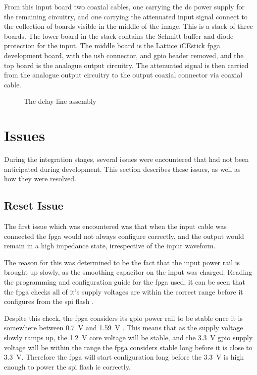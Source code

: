 From this input board two coaxial cables, one carrying the \gls{dc} power supply for the remaining circuitry, and one carrying the attenuated input signal connect to the collection of boards visible in the middle of the image. This is a stack of three boards. The lower board in the stack contains the Schmitt buffer and diode protection for the input. The middle board is the Lattice iCEstick \gls{fpga} development board, with the \gls{usb} connector, and \gls{gpio} header removed, and the top board is the analogue output circuitry. The attenuated signal is then carried from the analogue output circuitry to the output coaxial connector via coaxial cable.

\begin{figure}[ht]
	\centering
	\caption{The delay line assembly}
	\label{fig:delay-line-assy}
\end{figure}



\section{Issues}

During the integration stages, several issues were encountered that had not been anticipated during development. This section describes these issues, as well as how they were resolved.

\subsection{ Reset Issue}
The first issue which was encountered was that when the input cable was connected the \gls{fpga} would not always configure correctly, and the output would remain in a high impedance state, irrespective of the input waveform.

The reason for this was determined to be the fact that the input power rail is brought up slowly, as the smoothing capacitor on the input was charged. Reading the programming and configuration guide for the \gls{fpga} used, it can be seen that the \gls{fpga} checks all of it's supply voltages are within the correct range before it configures from the \gls{spi} flash \cite[p.4]{lattice2016}.

Despite this check, the \gls{fpga} considers its \gls{gpio} power rail to be stable once it is somewhere between \SI{0.7}{\volt} and \SI{1.59}{\volt} \cite[p.3-2]{lattice2017a}. This means that as the supply voltage slowly ramps up, the \SI{1.2}{\volt} core voltage will be stable, and the \SI{3.3}{\volt} \gls{gpio} supply voltage will be within the range the \gls{fpga} considers stable long before it is close to \SI{3.3}{\volt}. Therefore the \gls{fpga} will start configuration long before the \SI{3.3}{\volt} is high enough to power the \gls{spi} flash \gls{ic} correctly.


